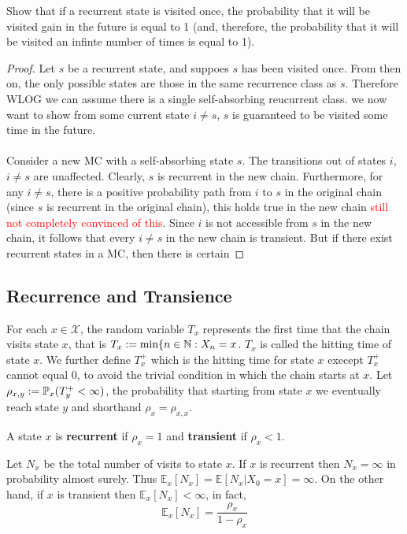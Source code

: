 \documentclass[11pt]{scrartcl}
\begin{document}
\begin{example}
  Show that if a recurrent state is visited once, the probability that it will
  be visited gain in the future is equal to 1 (and, therefore, the probability
  that it will be visited an infinte number of times is equal to 1).
  \begin{proof}
    Let $s$ be a recurrent state, and suppoes $s$ has been visited once. From
    then on, the only possible states are those in the same recurrence class as
    $s$. Therefore WLOG we can assume there is a single self-absorbing
    reucurrent class. we now want to show from some current state $i\neq s$,
    $s$ is guaranteed to be visited some time in the future.\\\\ Consider a new
    MC with a self-absorbing state $s$. The transitions out of states $i$,
    $i\neq s$ are unaffected. Clearly, $s$ is recurrent in the new chain.
    Furthermore, for any $i\neq s$, there is a positive probability path from
    $i$ to $s$ in the original chain (since $s$ is recurrent in the original
    chain), this holds true in the new chain \textcolor{red}{still not
    completely convinced of this}. Since $i$ is not accessible from $s$ in the
    new chain, it follows that  every $i\neq s$ in the new chain is transient.
    But if there exist recurrent states in a MC, then there is certain 
  \end{proof}
\end{example}
\subsection{Recurrence and Transience}
For each $x\in \mathcal{X} $, the random variable $T_{x} $ represents the first
time that the chain visits state $x$, that is $T_{x}:= \min \{n\in \mathbb{N}: X_{n}
  = x $. $T_{x} $ is called the hitting time of state $x$. We further define
  $T_{x}^{+}  $ which is the hitting time for state $x$ execept $T_{x}^{+}
  $ cannot equal 0, to avoid the trivial condition in which the chain starts at
  $x$. 
  Let $\rho_{x,y}:=\mathbb{P}_x(T_{y}^{+} < \infty  )$, the probability that starting
  from state $x$ we eventually reach state $y$ and shorthand
  $\rho_{x}=\rho_{x,x}  $. 
  \begin{definition}
    A state $x$ is \textbf{recurrent}  if $\rho_{x}=1 $ and \textbf{transient}
  if $\rho_{x}<1 $.
  \end{definition}
  \begin{proposition}
    Let $N_{x} $ be the total number of visits to state $x$. If $x$ is
    recurrent then $N_{x}=\infty $ in probability almost surely. Thus
    $\mathbb{E}_{x} [N_{x} ] = \mathbb{E} [N_{x} | X_{0}=x  ] =\infty$. On
    the other hand, if $x$ is transient then $\mathbb{E}_{x} [N_{x}
    ] < \infty$, in fact, \[
      \mathbb{E}_{x} [N_{x} ]  = \frac{\rho_{x}}{1-\rho_{x}}
    \]  
  \end{proposition}
\end{document}
